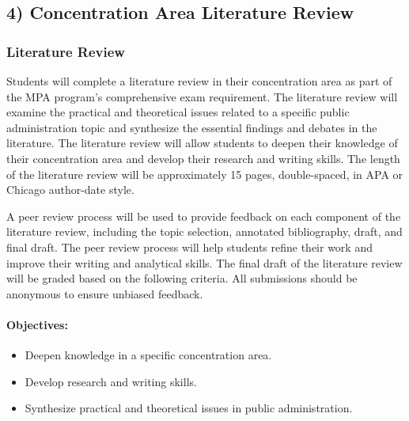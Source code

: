 \documentclass[12pt, letterpaper]{article}
\begin{document}
\subsection*{4) Concentration Area Literature Review}

\subsubsection*{Literature Review}

Students will complete a literature review in their concentration area as part of the MPA program's comprehensive exam requirement. The literature review will examine the practical and theoretical issues related to a specific public administration topic and synthesize the essential findings and debates in the literature. The literature review will allow students to deepen their knowledge of their concentration area and develop their research and writing skills. The length of the literature review will be approximately 15 pages, double-spaced, in APA or Chicago author-date style.

A peer review process will be used to provide feedback on each component of the literature review, including the topic selection, annotated bibliography, draft, and final draft. The peer review process will help students refine their work and improve their writing and analytical skills. The final draft of the literature review will be graded based on the following criteria. All submissions should be anonymous to ensure unbiased feedback.


\paragraph*{Objectives:}
\begin{itemize}
    \item Deepen knowledge in a specific concentration area.
    \item Develop research and writing skills.
    \item Synthesize practical and theoretical issues in public administration.
\end{itemize}
\end{document}
